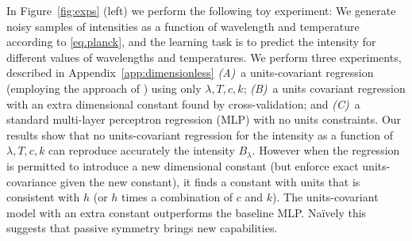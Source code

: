 \documentclass[accepted]{article}
\newcommand{\figref}[1]{Figure~\ref{#1}}
\begin{document}
In \figref{fig:exps} (left) we perform the following toy experiment:
We generate noisy samples of intensities as a function of wavelength and temperature according to \eqref{eq.planck}, and the learning task is to predict the intensity for different values of wavelengths and temperatures.
We perform three experiments, described in Appendix~\ref{app:dimensionless}
\textsl{(A)}~a units-covariant regression (employing the approach of \citealt{villar2022dimensionless}) using only $\lambda, T, c, k$; \textsl{(B)}~a units covariant regression with an extra dimensional constant found by cross-validation; and \textsl{(C)}~a standard multi-layer perceptron regression (MLP) with no units constraints.
Our results show that no units-covariant regression for the intensity as a function of $\lambda, T, c, k$ can reproduce accurately the intensity $B_\lambda$.
However when the regression is permitted to introduce a new dimensional constant (but enforce exact units-covariance given the new constant), it finds a constant with units that is consistent with $h$ (or $h$ times a combination of $c$ and $k$).
The units-covariant model with an extra constant outperforms the baseline MLP.
Na\"ively this suggests that passive symmetry brings new capabilities.
\end{document}
